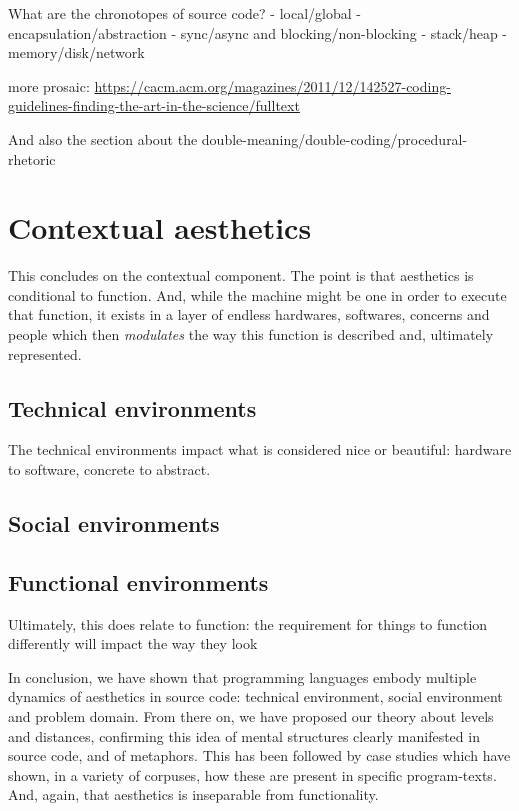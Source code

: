 What are the chronotopes of source code?
- local/global
- encapsulation/abstraction
- sync/async and blocking/non-blocking
- stack/heap
- memory/disk/network

more prosaic: \url{https://cacm.acm.org/magazines/2011/12/142527-coding-guidelines-finding-the-art-in-the-science/fulltext}

And also the section about the double-meaning/double-coding/procedural-rhetoric

\section{Contextual aesthetics}
\label{sec:contextual-aesthetics}

This concludes on the contextual component. The point is that aesthetics is conditional to function. And, while the machine might be one in order to execute that function, it exists in a layer of endless hardwares, softwares, concerns and people which then \emph{modulates} the way this function is described and, ultimately represented.

\subsection{Technical environments}
\label{subsec:technical-environments}

The technical environments impact what is considered nice or beautiful: hardware to software, concrete to abstract.

\subsection{Social environments}
\label{subsec:social-environments}

\subsection{Functional environments}
\label{subsec:functional-environments}

Ultimately, this does relate to function: the requirement for things to function differently will impact the way they look

\spacer


In conclusion, we have shown that programming languages embody multiple dynamics of aesthetics in source code: technical environment, social environment and problem domain. From there on, we have proposed our theory about levels and distances, confirming this idea of mental structures clearly manifested in source code, and of metaphors. This has been followed by case studies which have shown, in a variety of corpuses, how these are present in specific program-texts. And, again, that aesthetics is inseparable from functionality.